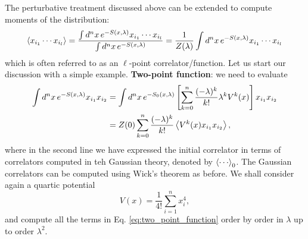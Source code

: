 \documentclass{article}
\numberwithin{equation}{section}
\begin{document}
The perturbative treatment discussed above can be extended to compute moments of the distribution:
\begin{equation} \label{eq:twopoint_correlator}
    \ev{x_{i_1} \cdots x_{i_l}} = \frac{\int d^nx \, e^{-S(x,\lambda)} x_{i_1} \cdots x_{i_l}}{\int d^nx\, e^{-S(x,\lambda)}} = \frac{1}{Z(\lambda)} \int d^nx\, e^{-S(x,\lambda)} x_{i_1} \cdots x_{i_l}
\end{equation}
which is often referred to as an $\ell$-point correlator/function. Let us start our discussion with a simple example. 
\textbf{Two-point function}: we need to evaluate
\begin{equation}
\begin{aligned} \label{eq:two_point_function}
    \int d^nx \, e^{-S(x, \lambda)} x_{i_1} x_{i_2} &= \int d^nx \, e^{-S_0(x, \lambda)} \left[\sum_{k=0}^n \frac{(-\lambda)^k}{k!} \lambda^k V^k(x)\right] x_{i_1} x_{i_2} \\
    &= Z(0) \sum_{k=0}^n \frac{(-\lambda)^k}{k!} \ev{V^k(x) x_{i_1} x_{i_2}},
\end{aligned}
\end{equation}
where in the second line we have expressed the initial correlator in terms of correlators computed in teh Gaussian theory, denoted by $\ev{\cdots}_0$. The Gaussian correlators can be computed using Wick's theorem as before. We shall consider again a quartic potential
\begin{equation}
    V(x) = \frac{1}{4!} \sum_{i=1}^n x_i^4,
\end{equation}
and compute all the terms in Eq. \ref{eq:two_point_function} order by order in $\lambda$ up to order $\lambda^2$.
\end{document}
